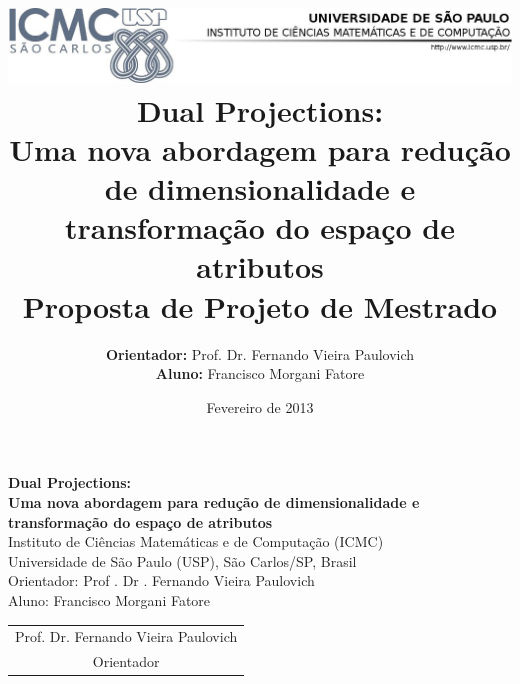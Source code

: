 \documentclass[brazil, a4paper, 12pt, titlepage]{article}
\title{
  \vspace{-4.5cm}
  \includegraphics[width=15cm]{images/logo.png}\\
  \vspace{6cm}
  \renewcommand{\baselinestretch}{1.75}{%
    \huge Dual Projections: \\ Uma nova abordagem para redução de dimensionalidade e transformação do espaço de atributos}
  \vspace{2cm}
  \Large \\
  Proposta de Projeto de Mestrado \\
}
\author{
  \textbf{Orientador:} Prof. Dr. Fernando Vieira Paulovich\\
  \textbf{Aluno:} Francisco Morgani Fatore\\
}
\date{Fevereiro de 2013}
\renewcommand{\baselinestretch}{1.75}{%
    \huge Dual Projections: \\ Uma nova abordagem para redução de dimensionalidade e transformação do espaço de atributos}
\renewcommand{\baselinestretch}{1.5} %
\begin{document}
\maketitle

\clearpage
\thispagestyle{empty}

\begin{center}
  \renewcommand{\baselinestretch}{1.0}{
    \large{\textbf{Dual Projections: \\ Uma nova abordagem para redução de dimensionalidade e transformação do espaço de atributos}\\
    \huge }
    \vspace{1.5cm}
    \normalsize{Instituto de Ciências Matemáticas e de Computação (ICMC)\\
    Universidade de São Paulo (USP), São Carlos/SP, Brasil}\\
    \vspace{1cm}
    \normalsize{Orientador: Prof . Dr . Fernando Vieira Paulovich\\
    Aluno: Francisco Morgani Fatore}
  }
  \vspace{1cm}
\end{center}



\clearpage

\thispagestyle{empty}
\tableofcontents  
\clearpage

\setcounter{page}{1}







\clearpage
\printbibliography

\vspace{1.5cm}
\begin{table}[htb]
  \centering
  \begin{tabular}{c}
    \hline
    Prof. Dr. Fernando Vieira Paulovich\\
    Orientador
  \end{tabular} 
\end{table}
\end{document}
